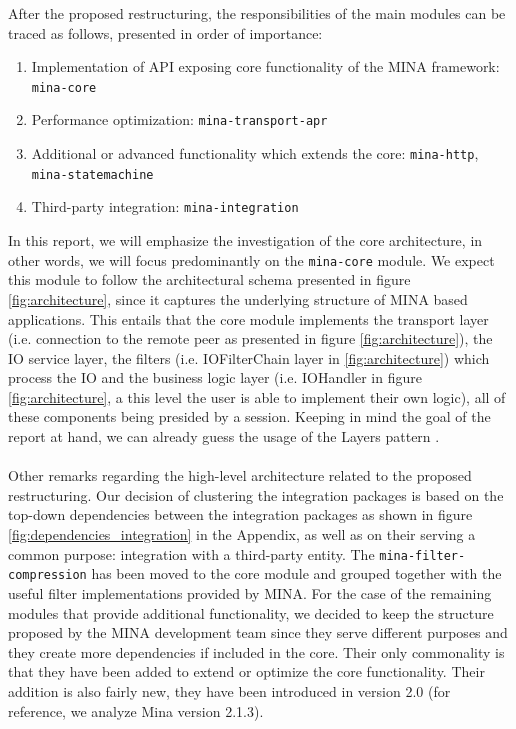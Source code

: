 After the proposed restructuring, the responsibilities of the main modules can be traced as follows, presented in order of importance:
\begin{enumerate}
    \item Implementation of API exposing core functionality of the MINA framework: \texttt{mina-core}
    \item Performance optimization: \texttt{mina-transport-apr}
    \item Additional or advanced functionality which extends the core:  \texttt{mina-http}, \texttt{mina-statemachine}
    \item Third-party integration: \texttt{mina-integration}
\end{enumerate}
In this report, we will emphasize the investigation of the core architecture, in other words, we will focus predominantly on the \texttt{mina-core} module. We expect this module to follow the architectural schema presented in figure \ref{fig:architecture}, since it captures the underlying structure of MINA based applications. This entails that the core module implements the transport layer (i.e. connection to the remote peer as presented in figure \ref{fig:architecture}), the IO service layer, the filters (i.e. IOFilterChain layer in \ref{fig:architecture})  which process the IO and the business logic layer (i.e. IOHandler in figure  \ref{fig:architecture}, a this level the user is able to implement their own logic), all of these components being presided by a session. Keeping in mind the goal of the report at hand, we can already guess the usage of the Layers pattern \cite{archi_patterns}. \\\\
Other remarks regarding the high-level architecture related to the proposed restructuring. Our decision of clustering the integration packages is based on the top-down dependencies between the integration packages as shown in figure \ref{fig:dependencies_integration} in the Appendix, as well as on their serving a common purpose: integration with a third-party entity. The \texttt{mina-filter-compression} has been moved to the core module and grouped together with the useful filter implementations provided by MINA. For the case of the remaining modules that provide additional functionality, we decided to keep the structure proposed by the MINA development team since they serve different purposes and they create more dependencies if included in the core. Their only commonality is that they have been added to extend or optimize the core functionality. Their addition is also fairly new, they have been introduced in version 2.0 (for reference, we analyze Mina version 2.1.3).

